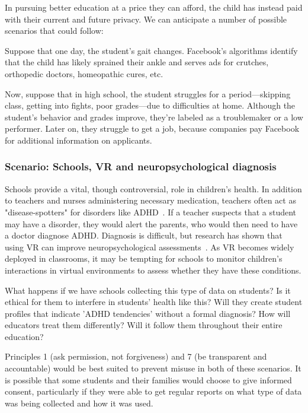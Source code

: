 In pursuing better education at a price they can afford, the child has instead paid with their current and future privacy. We can anticipate a number of possible scenarios that could follow:

Suppose that one day, the student's gait changes. Facebook's algorithms identify that the child has likely sprained their ankle and serves ads for crutches, orthopedic doctors, homeopathic cures, etc.

Now, suppose that in high school, the student struggles for a period---skipping class, getting into fights, poor grades---due to difficulties at home. Although the student's behavior and grades improve, they're labeled as a troublemaker or a low performer. Later on, they struggle to get a job, because companies pay Facebook for additional information on applicants.

\subsubsection{Scenario: Schools, VR and neuropsychological diagnosis}

Schools provide a vital, though controversial, role in children's health. In addition to teachers and nurses administering necessary medication, teachers often act as "disease-spotters" for disorders like ADHD~\cite{phillips2006medicine}. If a teacher suspects that a student may have a disorder, they would alert the parents, who would then need to have a doctor diagnose ADHD. Diagnosis is difficult, but research has shown that using VR can improve neuropsychological assessments~\cite{areces2018analysis}. As VR becomes widely deployed in classrooms, it may be tempting for schools to monitor children's interactions in virtual environments to assess whether they have these conditions.

What happens if we have schools collecting this type of data on students? Is it ethical for them to interfere in students' health like this? Will they create student profiles that indicate 'ADHD tendencies' without a formal diagnosis? How will educators treat them differently? Will it follow them throughout their entire education?

Principles 1 (ask permission, not forgiveness) and 7 (be transparent and accountable) would be best suited to prevent misuse in both of these scenarios. It is possible that some students and their families would choose to give informed consent, particularly if they were able to get regular reports on what type of data was being collected and how it was used.


